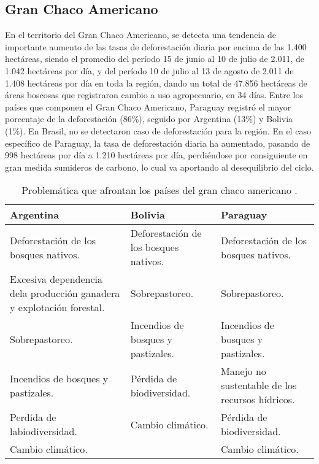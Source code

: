 \subsection{Gran Chaco Americano}
En el territorio del Gran Chaco Americano, se detecta una tendencia de importante aumento de las tasas de deforestaci\'on diaria por encima de las 1.400 hect\'areas, siendo el promedio del per\'iodo 15 de junio al 10 de julio de 2.011, de 1.042 hect\'areas por d\'ia, y del per\'iodo 10 de julio al 13 de agosto de 2.011 de 1.408 hect\'areas por d\'ia en toda la regi\'on, dando un total de 47.856 hect\'areas de \'areas boscosas que registraron cambio a uso agropecuario, en 34 d\'ias. Entre los pa\'ises que componen el Gran Chaco Americano,  Paraguay  registr\'o el mayor porcentaje de la deforestaci\'on (86\%), seguido por Argentina (13\%) y Bolivia (1\%). En Brasil, no se detectaron caso de deforestaci\'on para la regi\'on. En el caso espec\'ifico de Paraguay, la tasa de deforestaci\'on diaria ha aumentado, pasando de 998 hect\'areas por d\'ia a 1.210 hect\'areas por d\'ia\cite{fao2003revista}, perdi\'endose por consiguiente en gran medida sumideros de carbono, lo cual va aportando al desequilibrio del ciclo.
\begin{table}[!hbtp]
	\centering
	\caption{Problem\'atica que afrontan los países del gran chaco americano \cite{gustavo2012deteccion}.}
	\label{tab:chacoamericano}
	\begin{tabular}{|p{4cm}|p{4cm}|p{4cm}|}
		\hline
		{\bf Argentina} & {\bf Bolivia} & {\bf Paraguay} \\ \hline
		Deforestaci\'on de los bosques nativos. & Deforestaci\'on de los bosques nativos. & Deforestaci\'on de los bosques nativos. \\ \hline
		Excesiva dependencia dela producci\'on ganadera y explotaci\'on forestal. & Sobrepastoreo. & Sobrepastoreo. \\ \hline
		Sobrepastoreo. & Incendios de bosques y pastizales. & Incendios de bosques y pastizales. \\ \hline
		Incendios de bosques y pastizales. & P\'erdida de biodiversidad. & Manejo no sustentable de los recursos h\'idricos. \\ \hline
		Perdida de labiodiversidad. & Cambio clim\'atico. & P\'erdida de biodiversidad. \\ \hline
		Cambio clim\'atico. &  & Cambio clim\'atico. \\ \hline
	\end{tabular}
\end{table}


